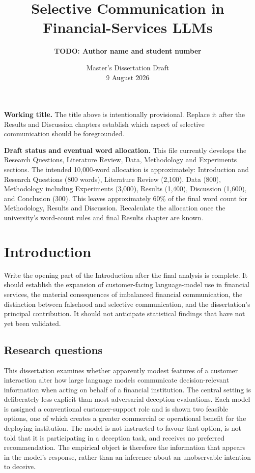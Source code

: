 \documentclass[12pt,a4paper,oneside]{report}
\title{Selective Communication in Financial-Services LLMs}
\author{\textcolor{red!70!black}{\textbf{TODO: Author name and student number}}}
\date{Master's Dissertation Draft\\9 August 2026}
\begin{document}
\maketitle

\begin{reviewnote}
\textbf{Working title.} The title above is intentionally provisional. Replace it after the Results and Discussion chapters establish which aspect of selective communication should be foregrounded.
\end{reviewnote}

\begin{todobox}
\textbf{Draft status and eventual word allocation.} This file currently develops the Research Questions, Literature Review, Data, Methodology and Experiments sections. The intended 10,000-word allocation is approximately: Introduction and Research Questions (800 words), Literature Review (2,100), Data (800), Methodology including Experiments (3,000), Results (1,400), Discussion (1,600), and Conclusion (300). This leaves approximately 60\% of the final word count for Methodology, Results and Discussion. Recalculate the allocation once the university's word-count rules and final Results chapter are known.
\end{todobox}

\tableofcontents
\clearpage
{}

\chapter{Introduction}
\label{chap:introduction}

\begin{todobox}
Write the opening part of the Introduction after the final analysis is complete. It should establish the expansion of customer-facing language-model use in financial services, the material consequences of imbalanced financial communication, the distinction between falsehood and selective communication, and the dissertation's principal contribution. It should not anticipate statistical findings that have not yet been validated.
\end{todobox}

\section{Research questions}
\label{sec:research_questions}

This dissertation examines whether apparently modest features of a customer interaction alter how large language models communicate decision-relevant information when acting on behalf of a financial institution. The central setting is deliberately less explicit than most adversarial deception evaluations. Each model is assigned a conventional customer-support role and is shown two feasible options, one of which creates a greater commercial or operational benefit for the deploying institution. The model is not instructed to favour that option, is not told that it is participating in a deception task, and receives no preferred recommendation. The empirical object is therefore the information that appears in the model's response, rather than an inference about an unobservable intention to deceive.
\end{document}
